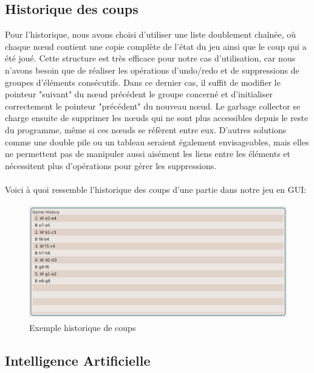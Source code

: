 \documentclass{article}
\begin{document}
\subsection{Historique des coups}
\par Pour l'historique, nous avons choisi d'utiliser une liste doublement chaînée, où chaque nœud contient une copie complète de l'état du jeu ainsi que le coup qui a été joué.
Cette structure est très efficace pour notre cas d'utilisation, car nous n'avons besoin que de réaliser les opérations d'undo/redo et de suppressions de groupes d'éléments consécutifs. Dans ce dernier cas, il suffit de modifier le pointeur "suivant" du nœud précédent le groupe concerné et d'initialiser correctement le pointeur "précédent" du nouveau nœud. Le garbage collector se charge ensuite de supprimer les nœuds qui ne sont plus accessibles depuis le reste du programme, même si ces nœuds se réfèrent entre eux.
D'autres solutions comme une double pile ou un tableau seraient également envisageables, mais elles ne permettent pas de manipuler aussi aisément les liens entre les éléments et nécessitent plus d'opérations pour gérer les suppressions.
\\
\\Voici à quoi ressemble l'historique des coups d'une partie dans notre jeu en GUI:\\

\begin{figure}[h]
    \caption{Exemple historique de coups}
    \centering
    \includegraphics[width=\textwidth,height=5.0cm,keepaspectratio]{historique-coups}
\end{figure}

\subsection{Intelligence Artificielle} \label{AI}
\end{document}
